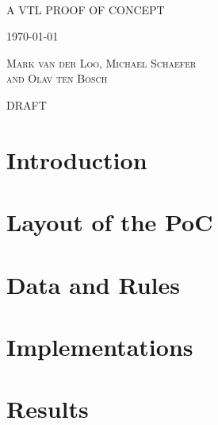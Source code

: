 \documentclass[fancyheadings,11pt]{book}
\begin{document}
\begin{center}
\thispagestyle{empty}
 \ \ \

\bigskip
\bigskip

{\huge
\textsc{A VTL PROOF OF CONCEPT}
}

\vspace{0.5 cm}
\textsc{\today}

\vspace{1.8 cm}
\textsc{\Large Mark van der Loo, Michael Schaefer\\and Olav ten Bosch}


\vspace{2 cm}
\textsc{\Large DRAFT}

\end{center}

\newpage
\thispagestyle{empty}

\frontmatter
\tableofcontents

%

\mainmatter

\chapter{Introduction}
\label{introduction}


\chapter{Layout of the PoC}
\label{layoutpoc}
\noindent


\chapter{Data and Rules}
\label{datarules}
\noindent


\chapter{Implementations}
\label{implementations}
\noindent


\chapter{Results}
\label{results}
\noindent

\end{document}
